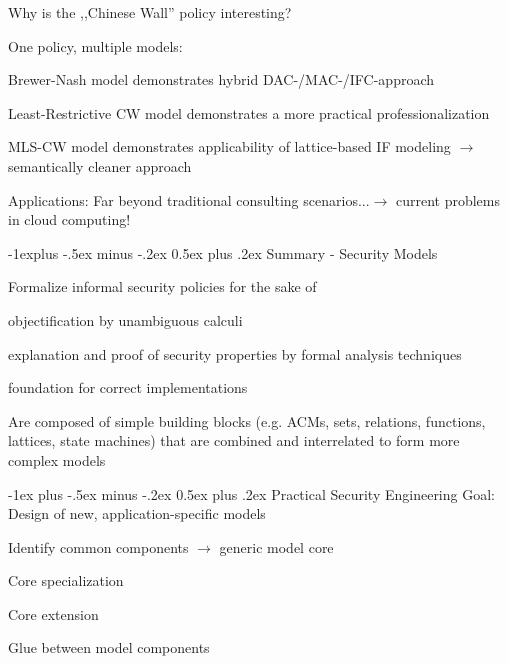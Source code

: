 \documentclass[a4paper]{article}
\makeatletter
\renewcommand{\section}{\@startsection{section}{1}{0mm}%
                {-1ex plus -.5ex minus -.2ex}%
                {0.5ex plus .2ex}%
                {\normalfont\large\bfseries}}
\renewcommand{\subsection}{\@startsection{subsection}{2}{0mm}%
                {-1explus -.5ex minus -.2ex}%
                {0.5ex plus .2ex}%
                {\normalfont\normalsize\bfseries}}
\makeatother
\begin{document}
\begin{multicols}{3}
    Why is the ,,Chinese Wall'' policy interesting?
    \begin{itemize*}
        \item One policy, multiple models:
        \item Brewer-Nash model demonstrates hybrid DAC-/MAC-/IFC-approach
        \item Least-Restrictive CW model demonstrates a more practical professionalization
        \item MLS-CW model demonstrates applicability of lattice-based IF modeling $\rightarrow$ semantically cleaner approach
        \item Applications: Far beyond traditional consulting scenarios...$\rightarrow$ current problems in cloud computing!
    \end{itemize*}

    \subsection{Summary - Security Models}
    \begin{itemize*}
        \item Formalize informal security policies for the sake of
        \begin{itemize*}
            \item objectification by unambiguous calculi
            \item explanation and proof of security properties by formal analysis techniques
            \item foundation for correct implementations
        \end{itemize*}
        \item Are composed of simple building blocks (e.g. ACMs, sets, relations, functions, lattices, state machines) that are combined and interrelated to form more complex models
    \end{itemize*}

    \section{Practical Security Engineering}
    Goal: Design of new, application-specific models
    \begin{itemize*}
        \item Identify common components $\rightarrow$ generic model core
        \item Core specialization
        \item Core extension
        \item Glue between model components
    \end{itemize*}


\end{multicols}
\end{document}
